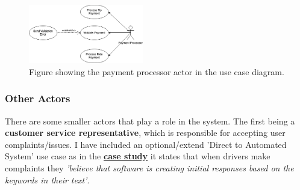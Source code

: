 \documentclass{article}
\begin{document}
      \begin{figure}[H]
        \centering
        \includegraphics[width=5cm]{assets/pp_use_case.drawio.png}
        \caption{Figure showing the payment processor actor in the use case diagram.}
        \label{fig:ppUseCase}
      \end{figure}

    \subsubsection{Other Actors}
      There are some smaller actors that play a role in the system. The first being a \textbf{customer service representative}, which is responsible for accepting user
      complaints/issues. I have included an optional/extend 'Direct to Automated System' use case as in the \href{https://learn-eu-central-1-prod-fleet01-xythos.content.blackboardcdn.com/5d2cb9c32e9d7/4991549?X-Blackboard-Expiration=1653922800000&X-Blackboard-Signature=a2RnywjBpwblbDHmnp%2BXEpXu5N%2FFoCmkQs%2FBPlAAUAo%3D&X-Blackboard-Client-Id=163100&response-cache-control=private%2C%20max-age%3D21600&response-content-disposition=inline%3B%20filename%2A%3DUTF-8%27%27Reading1-Uber-CaseStudy%2520%25281%2529.hai.pdf&response-content-type=application%2Fpdf&X-Amz-Security-Token=IQoJb3JpZ2luX2VjEBgaDGV1LWNlbnRyYWwtMSJGMEQCIHIn%2BZn3gy3MjoPp7PH8o8SnEhgHocgjO0CPywLkcPIXAiAIwi1oSntPYzMUdrA%2FGVOy4wq4jKDGcCVfnD7ffXaIkSrcBAgREAIaDDYzNTU2NzkyNDE4MyIMbRXWMdMQ5uaeyu%2BXKrkEseD2PJmHV%2Fj1ElO5YaeFrgTrUJewyFaGJTLDptki%2Fw6Q%2Bfwo0H6dymEdL4rI6suCDdx2RwJxWKHNCDeFPFh15O0H6KG3qCcX%2FovlcsZ%2Bh499B6hJiMWnFXvUnuWaPcx%2BV6e01ECkcMfeo7brbj8ESEg6SQIJ1nX5BXlg7UtRDLXTosDkKcWx7v1BCND32q1UkRbr%2Bs5J4iZpddBWaxLUsea0LF%2BjlQiS8%2FXREUTvbtgPmNRLSuQAbM7KWHTnEZvsbWOvwSG8nkcbQE8yTiQFrpoRUuWYt33NAVg6HXxNAwqTHGcVA8nbiPt2bN%2FLjEt344CUJYG0gA35UCtYf3DR0PrCzbrV2pEVioy0%2FX9Kvvbv2h1WYHvGD1Q%2BvrXMhizyd2InWYiU1X4EeMC7Im1rHbYt0qo3RXKqZlzNxM%2F0zaNe0IRkbsGQJarkF5DP3bz7NeU188afhSfu7T6xYhAajAVrnGxhooCc3YI66br60NygfY2OAp2MeKI6dzNw0FdfsaA31f%2BZasU9n2aP3weV7AwZvaGMpGoXahuvjnJ9mKuWKc6HrWu8HPJhq7Wr3mOC9bd8YBDG2WzIrB9kM45iNQOTG67CMF5x7eXj4KNVntZgG63Jn%2BBxiVLgIxMR55%2BsA0IkQ9DXQoj0esQ2J3JBystYLTp79c5N5hB4iUr1w4i%2Fm20B1XVarZjUTObKPU%2FOhVMd2J0L3G3zBNVRH0el8n8UoO1L8s8M%2BITAhjLhoOO7%2BLkRlFfNmSUwpPvRlAY6qgH6gVLQCu8%2B4x1Gr4OZSSDIGJg8JceJGTGUuQTC4zObK%2FZFQf%2BCrgd5Yq9gmyB%2BAOERsBIpT6ovUVoNUY5CAx%2FHixZ6KneGKse3MAew4DX1G%2BVgC9yLWmgKAHtv0GZxfXyNshE3L9BSYbygxLiRZTj%2BEnF1Sb5WuM%2FANwhzfr%2Fv7xbJO8gk6ThTqegZJ%2FVz13WjTdieKNSwy4yyux01cLEanOenPhlqjOhSpg%3D%3D&X-Amz-Algorithm=AWS4-HMAC-SHA256&X-Amz-Date=20220530T090000Z&X-Amz-SignedHeaders=host&X-Amz-Expires=21600&X-Amz-Credential=ASIAZH6WM4PL5GS33QWA%2F20220530%2Feu-central-1%2Fs3%2Faws4_request&X-Amz-Signature=3bdd17adaf97b1927bdb8b06a7be5ddc78ca982d1660562cfa92729d6cdc622f}{\textbf{case study}}
      it states that when drivers make complaints they \textit{'believe that software is creating initial responses based on the keywords in their text'}.
\end{document}
